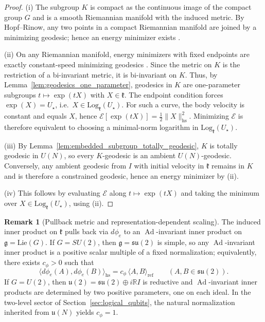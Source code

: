 \documentclass{article}%
\theoremstyle{definition}
\newtheorem{remark}[theorem]{Remark}
\numberwithin{equation}{section}
\newcommand{\R}{\mathbb{R}}
\newcommand{\Log}{\mathrm{Log}}
\newcommand{\Lie}{\mathrm{Lie}}
\DeclareMathOperator{\Ad}{Ad}
\begin{document}
\begin{proof}
(i) The subgroup $K$ is compact as the continuous image of the compact group $G$ and is a smooth Riemannian manifold with the induced metric.
By Hopf--Rinow, any two points in a compact Riemannian manifold are joined by a minimizing geodesic; hence an energy minimizer exists
\cite{doCarmoRiemannian,KobayashiNomizuI}.

(ii) On any Riemannian manifold, energy minimizers with fixed endpoints are exactly constant-speed minimizing geodesics
\cite[\S~6.4]{doCarmoRiemannian}. Since the metric on $K$ is the restriction of a bi-invariant metric, it is bi-invariant on $K$.
Thus, by Lemma~\ref{lem:geodesics_one_parameter}, geodesics in $K$ are one-parameter subgroups $t\mapsto \exp(tX)$ with $X\in\mathfrak{k}$.
The endpoint condition forces $\exp(X)=U_\star$, i.e.\ $X\in\Log_{\mathfrak{k}}(U_{\star})$.
For such a curve, the body velocity is constant and equals $X$, hence $\mathcal{E}[\exp(tX)]=\tfrac12\|X\|_{\mathrm{hs}}^{2}$.
Minimizing $\mathcal{E}$ is therefore equivalent to choosing a minimal-norm logarithm in $\Log_{\mathfrak{k}}(U_\star)$.

(iii) By Lemma~\ref{lem:embedded_subgroup_totally_geodesic}, $K$ is totally geodesic in $U(N)$, so every $K$-geodesic is an ambient
$U(N)$-geodesic. Conversely, any ambient geodesic from $I$ with initial velocity in $\mathfrak{k}$ remains in $K$ and is therefore a
constrained geodesic, hence an energy minimizer by (ii).

(iv) This follows by evaluating $\mathcal{E}$ along $t\mapsto \exp(tX)$ and taking the minimum over $X\in\Log_{\mathfrak{k}}(U_{\star})$,
using (ii).
\end{proof}

\begin{remark}[Pullback metric and representation-dependent scaling]\label{rem:metric_scaling_index}
The induced inner product on $\mathfrak{k}$ pulls back via $d\phi_e$ to an $\Ad$-invariant inner product on $\mathfrak g=\Lie(G)$.
If $G=SU(2)$, then $\mathfrak g=\mathfrak{su}(2)$ is simple, so any $\Ad$-invariant inner product is a positive scalar multiple of a fixed
normalization; equivalently, there exists $c_\phi>0$ such that
\[
\big\langle d\phi_e(A),d\phi_e(B)\big\rangle_{\mathrm{hs}}=c_\phi\,\langle A,B\rangle_{\mathrm{ref}}
\qquad (A,B\in\mathfrak{su}(2)).
\]
If $G=U(2)$, then $\mathfrak{u}(2)=\mathfrak{su}(2)\oplus i\R I$ is reductive and $\Ad$-invariant inner products are determined by two
positive parameters, one on each ideal.
In the two-level sector of Section~\ref{sec:logical_qubits}, the natural normalization inherited from $\mathfrak u(N)$ yields $c_\phi=1$.
\end{remark}
\end{document}
